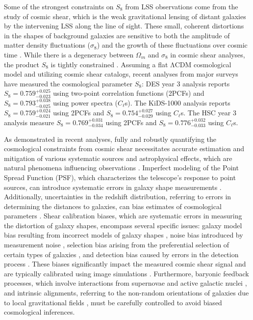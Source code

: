 Some of the strongest constraints on $S_8$ from LSS observations come from the study of cosmic shear, which is the weak gravitational lensing of distant galaxies by the intervening LSS along the line of sight. 
These small, coherent distortions in the shapes of background galaxies are sensitive to both the amplitude of matter density fluctuations ($\sigma_8$) and the growth of these fluctuations over cosmic time \citep{2001PhR...340..291B, 2010CQGra..27w3001B, 2015RPPh...78h6901K}. While there is a degeneracy between $\Omega_m$ and $\sigma_8$ in cosmic shear analyses, the product $S_8$ is tightly constrained \citep{2015RPPh...78h6901K, 2018ARA&A..56..393M}. Assuming a flat ΛCDM cosmological model and utilizing cosmic shear catalogs, recent analyses from major surveys have measured the cosmological parameter $S_8$: DES year 3 analysis reports $S_8 = 0.759^{+0.025}_{-0.023}$ \citep{2022PhRvD.105b3514A, PhysRevD.105.023515} using two-point correlation functions (2PCFs) and $S_8 = 0.793^{+0.038}_{-0.025}$ \citep{2022MNRAS.515.1942D} using power spectra ($C_\ell$s). The KiDS-1000 analysis reports $S_8 = 0.759^{+0.024}_{-0.021}$ \citep{2021A&A...645A.104A} using 2PCFs and $S_8 = 0.754^{+0.027}_{-0.029}$ \citep{2022A&A...665A..56L} using $C_\ell$s. The HSC year 3 analysis measure $S_8 = 0.769^{+0.031}_{-0.034}$ \citep{2023PhRvD.108l3518L} using 2PCFs and $S_8 = 0.776^{+0.032}_{-0.033}$ \citep{2023PhRvD.108l3519D} using $C_\ell$s.

As demonstrated in recent analyses, fully and robustly quantifying the cosmological constraints from cosmic shear necessitates accurate estimation and mitigation of various systematic sources and astrophysical effects, which are natural phenomena influencing observations \citep{2023PhRvD.108l3519D}. Imperfect modeling of the Point Spread Function (PSF), which characterizes the telescope's response to point sources, can introduce systematic errors in galaxy shape measurements \citep{2023MNRAS.525.2441Z}. Additionally, uncertainties in the redshift distribution, referring to errors in determining the distances to galaxies, can bias estimates of cosmological parameters \citep{2023MNRAS.518..709Z}. Shear calibration biases, which are systematic errors in measuring the distortion of galaxy shapes, encompass several specific issues: galaxy model bias resulting from incorrect models of galaxy shapes \citep{2010MNRAS.406.2793B}, noise bias introduced by measurement noise \citep{2012MNRAS.425.1951R}, selection bias arising from the preferential selection of certain types of galaxies \citep{2000ApJ...537..555K}, and detection bias caused by errors in the detection process \citep{2020ApJ...902..138S}. These biases significantly impact the measured cosmic shear signal and are typically calibrated using image simulations \citep{2018MNRAS.481.3170M}. Furthermore, baryonic feedback processes, which involve interactions from supernovae and active galactic nuclei \citep{2016MNRAS.459.1468M, 2018MNRAS.480.3962C}, and intrinsic alignments, referring to the non-random orientations of galaxies due to local gravitational fields \citep{2015SSRv..193....1J, 2015SSRv..193..139K, 2015SSRv..193...67K}, must be carefully controlled to avoid biased cosmological inferences.

